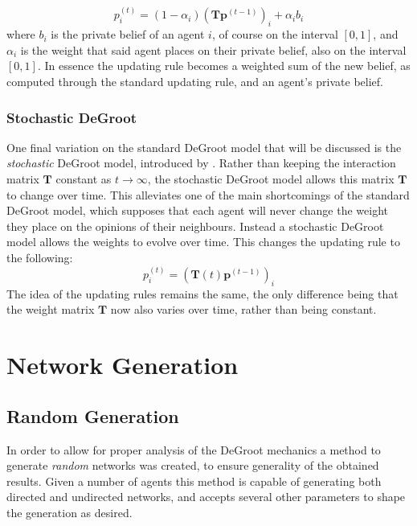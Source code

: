 \documentclass{article}
\newcommand{\beli}[3][2]{p_{#2}^{(#3)}}
\begin{document}
\begin{equation}
    \beli{i}{t} = (1-\alpha_i)(\textbf{T}\textbf{p}^{(t-1)})_i + \alpha_i b_i
\end{equation}
where $b_i$ is the private belief of an agent $i$, of course on the interval $[0, 1]$, and $\alpha_i$ is the weight that said agent places on their private belief, also on the interval $[0, 1]$. In essence the updating rule becomes a weighted sum of the new belief, as computed through the standard updating rule, and an agent's private belief.

\subsubsection{Stochastic DeGroot}

One final variation on the standard DeGroot model that will be discussed is the \emph{stochastic} DeGroot model, introduced by \cite{chatterjee1977stochastic}. Rather than keeping the interaction matrix $\textbf{T}$ constant as $t \to \infty$, the stochastic DeGroot model allows this matrix $\textbf{T}$ to change over time. This alleviates one of the main shortcomings of the standard DeGroot model, which supposes that each agent will never change the weight they place on the opinions of their neighbours. Instead a stochastic DeGroot model allows the weights to evolve over time. This changes the updating rule to the following:
\begin{equation*}
    \beli{i}{t} =(\textbf{T}(t)\textbf{p}^{(t-1)})_i
\end{equation*}
The idea of the updating rules remains the same, the only difference being that the weight matrix $\textbf{T}$ now also varies over time, rather than being constant.

\newpage

\section{Network Generation}

\subsection{Random Generation}
\label{generation:random}
In order to allow for proper analysis of the DeGroot mechanics a method to generate \emph{random} networks was created, to ensure generality of the obtained results. Given a number of agents this method is capable of generating both directed and undirected networks, and accepts several other parameters to shape the generation as desired.
\end{document}
